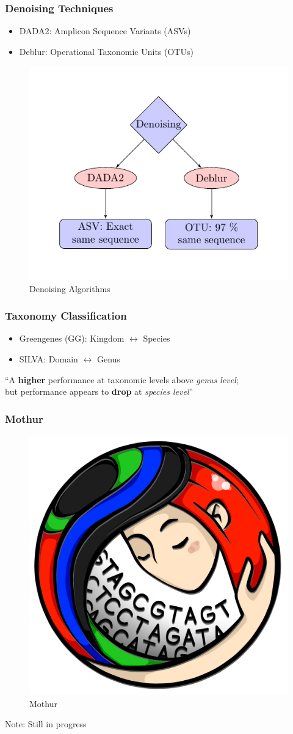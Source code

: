 \documentclass{beamer}
\begin{document}
    \begin{frame}
        \frametitle{Denoising Techniques}

        \begin{itemize}
            \item DADA2: Amplicon Sequence Variants (ASVs) \cite{DADA2}
            \item Deblur: Operational Taxonomic Units (OTUs) \cite{Deblur1}
        \end{itemize}

        \begin{figure}
            \includegraphics[width=0.4 \linewidth]{figures/tikz/denoising.pdf}
            \caption{Denoising Algorithms}
        \end{figure}
    \end{frame}

    \begin{frame}
        \frametitle{Taxonomy Classification}

        \begin{itemize}
            \item Greengenes (GG): Kingdom $\leftrightarrow$ Species \cite{greengenes1}
            \item SILVA: Domain $\leftrightarrow$ Genus \cite{silva1, silva2}
        \end{itemize}

        “A \textbf{higher} performance at taxonomic levels above \textit{genus level}; \\
        but performance appears to \textbf{drop} at \textit{species level}” \cite{performance1}
    \end{frame}

    \begin{frame}
        \frametitle{Mothur}

        \begin{figure}[h!]
            \includegraphics[width=0.3 \linewidth]{figures/mothur.png}
            \caption{Mothur}
        \end{figure}

        Note: Still in progress
    \end{frame}
\end{document}
